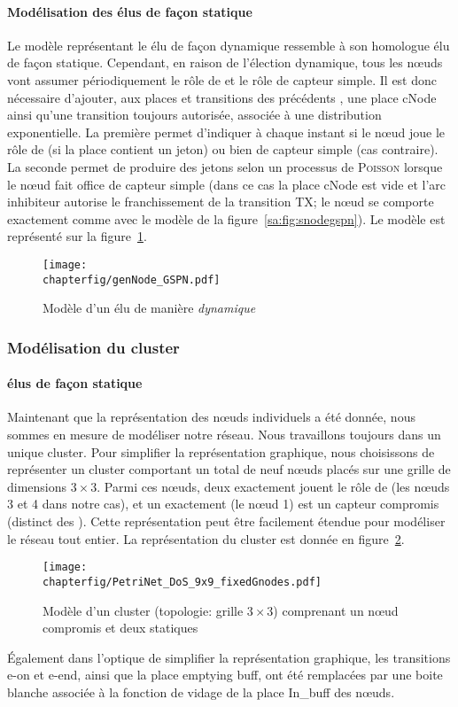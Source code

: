             \paragraph{Modélisation des \cns élus de façon statique}
Le modèle \rpsge représentant le \cn élu de façon dynamique ressemble à son homologue élu de façon statique.
Cependant, en raison de l'élection dynamique, tous les nœuds vont assumer périodiquement le rôle de \cn et le rôle de capteur simple.
Il est donc nécessaire d'ajouter, aux places et transitions des précédents \cns, une place \textsf{cNode} ainsi qu'une transition toujours autorisée, associée à une distribution exponentielle.
La première permet d'indiquer à chaque instant si le nœud joue le rôle de \cn (si la place contient un jeton) ou bien de capteur simple (cas contraire).
La seconde permet de produire des jetons selon un processus de \textsc{Poisson} lorsque le nœud fait office de capteur simple (dans ce cas la place \textsf{cNode} est vide et l'arc inhibiteur autorise le franchissement de la transition \textsf{TX}; le nœud se comporte exactement comme avec le modèle de la figure~\ref{sa:fig:snodegspn}).
Le modèle est représenté sur la figure~\ref{sa:fig:cnodegspn2}.
\begin{figure}[H]
    \centering
    \texttt{[image: \\chapterfig/genNode\_GSPN.pdf]}
    \caption{Modèle \rpsge d'un \cn élu de manière \emph{dynamique}}\label{sa:fig:cnodegspn2}
\end{figure}

        \subsubsection{Modélisation du cluster}

            \paragraph{\cns élus de façon statique}
Maintenant que la représentation des nœuds individuels a été donnée, nous sommes en mesure de modéliser notre réseau.
Nous travaillons toujours dans un unique cluster.
Pour simplifier la représentation graphique, nous choisissons de représenter un cluster comportant un total de neuf nœuds placés sur une grille de dimensions $3\times3$.
Parmi ces nœuds, deux exactement jouent le rôle de \cn (les nœuds \textsf{3} et \textsf{4} dans notre cas), et un exactement (le nœud \textsf{1}) est un capteur compromis (distinct des \cns).
Cette représentation peut être facilement étendue pour modéliser le réseau tout entier.
La représentation du cluster est donnée en figure~\ref{sa:fig:petricluster}.
\begin{figure}[H]
    \centering
    \texttt{[image: \\chapterfig/PetriNet\_DoS\_9x9\_fixedGnodes.pdf]}
    \caption{Modèle \rpsge d'un cluster (topologie: grille $3\times3$) comprenant un nœud compromis et deux \cns statiques}\label{sa:fig:petricluster}
\end{figure}
Également dans l'optique de simplifier la représentation graphique, les transitions \textsf{e-on} et \textsf{e-end}, ainsi que la place \textsf{emptying buff}, ont été remplacées par une boite blanche associée à la fonction de vidage de la place \textsf{In\_buff} des nœuds.

